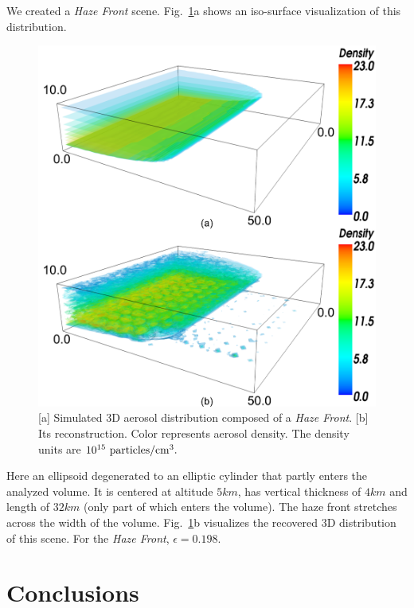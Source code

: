 \documentclass[10pt,letterpaper]{article}
\newcommand{\yoavcomment}[1]{}
\renewcommand{\yoavcomment}[1]{#1} %
\begin{document}
We created a {\em Haze Front} scene. Fig.~\ref{fig:simulation2}a shows
an iso-surface visualization of this distribution.
\begin{figure}
  \centering
  \yoavcomment{\includegraphics[width=\columnwidth]{images/simulation2}}
  \caption{\small [a] Simulated 3D aerosol distribution composed of a
    {\em Haze Front}. [b] Its reconstruction. Color represents aerosol
    density. The density units are $10^{15}~{\rm particles}/{\rm
      cm}^3.$}
  \label{fig:simulation2}
\end{figure}
Here an ellipsoid degenerated to an elliptic cylinder that partly
enters the analyzed volume. It is centered at altitude $5km$, has
vertical thickness of $4km$ and length of $32km$ (only part of which
enters the volume). The haze front stretches across the width of the
volume.  Fig.~\ref{fig:simulation2}b visualizes the recovered 3D
distribution of this scene. For the {\em Haze Front},
$\epsilon=0.198$.


\section{Conclusions}
\label{sec:conclusions}
\end{document}
